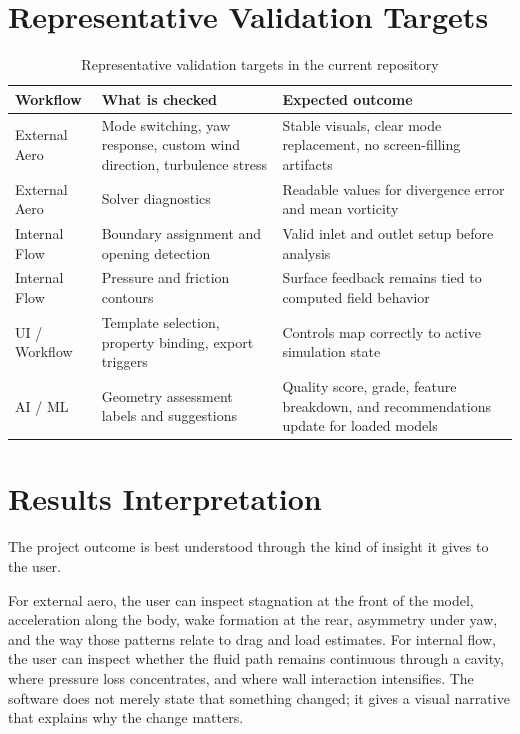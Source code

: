 \documentclass[12pt,a4paper,titlepage]{report}
\begin{document}
\section{Representative Validation Targets}
\begin{table}[H]
\centering
\caption{Representative validation targets in the current repository}
\label{tab:validation}
\begin{tabular}{p{3.2cm}p{4.9cm}p{4.8cm}}
\toprule
\textbf{Workflow} & \textbf{What is checked} & \textbf{Expected outcome} \\
\midrule
External Aero & Mode switching, yaw response, custom wind direction, turbulence stress & Stable visuals, clear mode replacement, no screen-filling artifacts \\
External Aero & Solver diagnostics & Readable values for divergence error and mean vorticity \\
Internal Flow & Boundary assignment and opening detection & Valid inlet and outlet setup before analysis \\
Internal Flow & Pressure and friction contours & Surface feedback remains tied to computed field behavior \\
UI / Workflow & Template selection, property binding, export triggers & Controls map correctly to active simulation state \\
AI / ML & Geometry assessment labels and suggestions & Quality score, grade, feature breakdown, and recommendations update for loaded models \\
\bottomrule
\end{tabular}
\end{table}

\section{Results Interpretation}
The project outcome is best understood through the kind of insight it gives to the user.

For external aero, the user can inspect stagnation at the front of the model, acceleration along the body, wake formation at the rear, asymmetry under yaw, and the way those patterns relate to drag and load estimates. For internal flow, the user can inspect whether the fluid path remains continuous through a cavity, where pressure loss concentrates, and where wall interaction intensifies. The software does not merely state that something changed; it gives a visual narrative that explains why the change matters.
\end{document}
